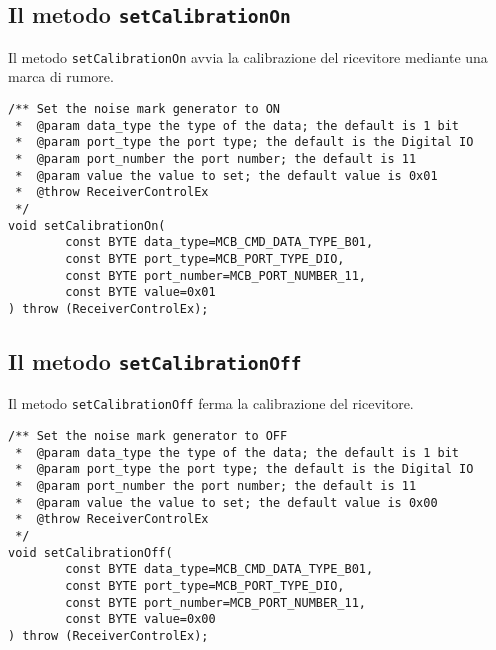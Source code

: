 \subsection{Il metodo \texttt{setCalibrationOn}}
Il metodo \texttt{setCalibrationOn} avvia la calibrazione del ricevitore mediante 
una marca di rumore.
\lstset{language=C++}
\begin{lstlisting}[caption={Dichiarazione del metodo \texttt{setCalibrationOn}},
label=lst:setCalibrationOn,mathescape]
/** Set the noise mark generator to ON 
 *  @param data_type the type of the data; the default is 1 bit
 *  @param port_type the port type; the default is the Digital IO
 *  @param port_number the port number; the default is 11
 *  @param value the value to set; the default value is 0x01
 *  @throw ReceiverControlEx
 */
void setCalibrationOn(
        const BYTE data_type=MCB_CMD_DATA_TYPE_B01, 
        const BYTE port_type=MCB_PORT_TYPE_DIO, 
        const BYTE port_number=MCB_PORT_NUMBER_11, 
        const BYTE value=0x01
) throw (ReceiverControlEx);
\end{lstlisting}
\lstset{numbers=none}


\subsection{Il metodo \texttt{setCalibrationOff}}
Il metodo \texttt{setCalibrationOff} ferma la calibrazione del ricevitore.
\lstset{language=C++}
\begin{lstlisting}[caption={Dichiarazione del metodo \texttt{setCalibrationOff}},
label=lst:setCalibrationOff,mathescape]
/** Set the noise mark generator to OFF
 *  @param data_type the type of the data; the default is 1 bit
 *  @param port_type the port type; the default is the Digital IO
 *  @param port_number the port number; the default is 11
 *  @param value the value to set; the default value is 0x00
 *  @throw ReceiverControlEx
 */
void setCalibrationOff(
        const BYTE data_type=MCB_CMD_DATA_TYPE_B01, 
        const BYTE port_type=MCB_PORT_TYPE_DIO, 
        const BYTE port_number=MCB_PORT_NUMBER_11, 
        const BYTE value=0x00
) throw (ReceiverControlEx);
\end{lstlisting}
\lstset{numbers=none}


